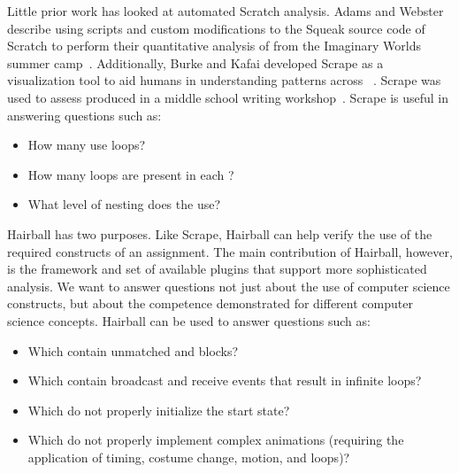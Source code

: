 Little prior work has looked at automated Scratch analysis.  Adams and Webster
describe using scripts and custom modifications to the Squeak source code of
Scratch to perform their quantitative analysis of  from the
Imaginary Worlds summer camp~\cite{Adams:2012:SLP:2157136.2157319}.
Additionally, Burke and Kafai developed Scrape as a visualization tool to aid
humans in understanding patterns across
~\cite{scrape-poster}. Scrape was used to assess 
produced in a middle school writing
workshop~\cite{Burke:2012:WWY:2157136.2157264}. Scrape is useful in answering
questions such as:
\begin{itemize}
\vspace*{-.025in}
\item How many  use loops?
\vspace*{-.025in}
\item How  many loops are present in each \sprogram{}?
\vspace*{-.025in}
\item What level of nesting does the \sprogram{} use?
\vspace*{-.025in}
\end{itemize}

Hairball has two purposes.  Like Scrape, Hairball can help verify the use of
the required constructs of an assignment.  The main contribution of Hairball,
however, is the framework and set of available plugins that support more
sophisticated analysis.  We want to answer questions not just about the use of
computer science constructs, but about the competence demonstrated for
different computer science concepts. Hairball can be used to answer questions
such as:
\begin{itemize}
\vspace*{-.025in}
\item Which  contain unmatched \broadcast{} and \receive{} blocks?
\vspace*{-.025in}
\item Which  contain broadcast and receive events that result in
  infinite loops?
\vspace*{-.025in}
\item Which  do not properly initialize the start state?
\vspace*{-.025in}
\item Which  do not properly implement complex animations
  (requiring the application of timing, costume change, motion, and loops)?
\vspace*{-.025in}
\end{itemize}
\vspace*{0.25in}
